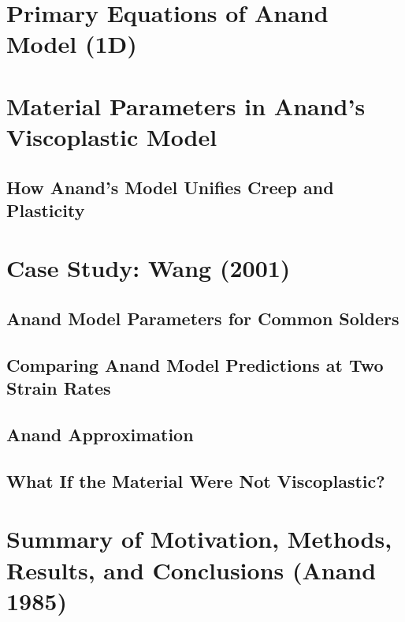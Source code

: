 \documentclass[11pt]{article}
\begin{document}
\section*{Primary Equations of Anand Model (1D)}
\label{sec:org2d035f8}




\section*{Material Parameters in Anand’s Viscoplastic Model}
\label{sec:org560d083}






\subsection*{How Anand’s Model Unifies Creep and Plasticity}
\label{sec:org0d914f0}








\section*{Case Study: Wang (2001)}
\label{sec:org823d96b}






\subsection*{Anand Model Parameters for Common Solders}
\label{sec:orgd3a2489}


\subsection*{Comparing Anand Model Predictions at Two Strain Rates}
\label{sec:org53839bb}



\subsection*{Anand Approximation}
\label{sec:org43e5499}

\subsection*{What If the Material Were Not Viscoplastic?}
\label{sec:orgd36a6b6}

\section*{Summary of Motivation, Methods, Results, and Conclusions (Anand 1985)}
\label{sec:orga82b5e6}
\end{document}
